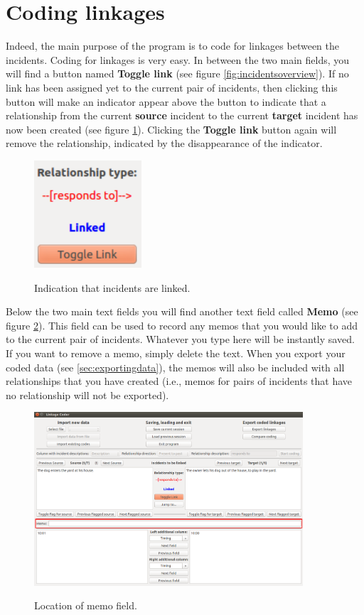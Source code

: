 \documentclass{memoir}
\begin{document}
\section{Coding linkages}
\label{sec:codinglinkages}

Indeed, the main purpose of the program is to code for linkages between the incidents. Coding for linkages is very easy. In between the two main fields, you will find a button named \textbf{Toggle link} (see figure \ref{fig:incidentsoverview}). If no link has been assigned yet to the current pair of incidents, then clicking this button will make an indicator appear above the button to indicate that a relationship from the current \textbf{source} incident to the current \textbf{target} incident has now been created (see figure \ref{fig:linkage}). Clicking the \textbf{Toggle link} button again will remove the relationship, indicated by the disappearance of the indicator.

\begin{figure}[h!]
  \centering
  \caption{Indication that incidents are linked.}
  \includegraphics[width=40mm]{Screenshot_10.pdf}
  \label{fig:linkage}
\end{figure}

Below the two main text fields you will find another text field called \textbf{Memo} (see figure \ref{fig:memo}). This field can be used to record any memos that you would like to add to the current pair of incidents. Whatever you type here will be instantly saved. If you want to remove a memo, simply delete the text. When you export your coded data (see \ref{sec:exportingdata}), the memos will also be included with all relationships that you have created (i.e., memos for pairs of incidents that have no relationship will not be exported). 

\begin{figure}[h!]
  \centering
  \caption{Location of memo field.}
  \includegraphics[width=100mm]{Screenshot_11.pdf}
  \label{fig:memo}
\end{figure}
\end{document}

